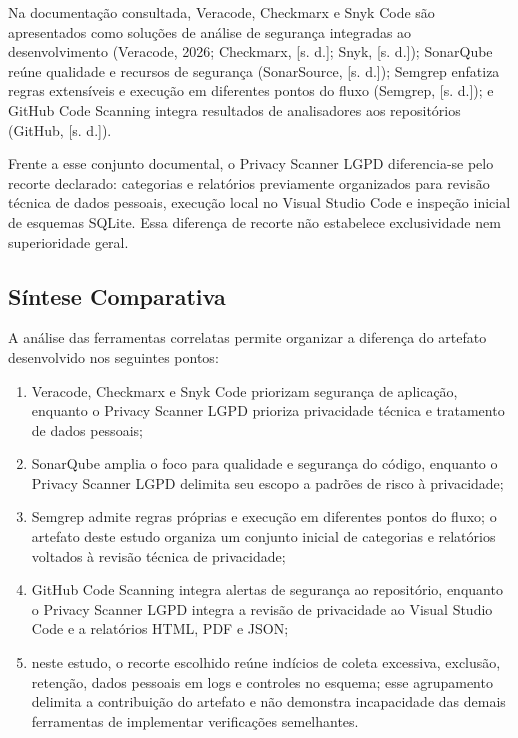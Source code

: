 \documentclass[12pt,a4paper,oneside]{report}
\begin{document}
Na documentação consultada, Veracode, Checkmarx e Snyk Code são apresentados como soluções de análise de segurança integradas ao desenvolvimento (Veracode, 2026; Checkmarx, [s. d.]; Snyk, [s. d.]); SonarQube reúne qualidade e recursos de segurança (SonarSource, [s. d.]); Semgrep enfatiza regras extensíveis e execução em diferentes pontos do fluxo (Semgrep, [s. d.]); e GitHub Code Scanning integra resultados de analisadores aos repositórios (GitHub, [s. d.]).

Frente a esse conjunto documental, o Privacy Scanner LGPD diferencia-se pelo recorte declarado: categorias e relatórios previamente organizados para revisão técnica de dados pessoais, execução local no Visual Studio Code e inspeção inicial de esquemas SQLite. Essa diferença de recorte não estabelece exclusividade nem superioridade geral.

\subsection{Síntese Comparativa}

A análise das ferramentas correlatas permite organizar a diferença do artefato desenvolvido nos seguintes pontos:

\begin{enumerate}
\item Veracode, Checkmarx e Snyk Code priorizam segurança de aplicação, enquanto o Privacy Scanner LGPD prioriza privacidade técnica e tratamento de dados pessoais;
\item SonarQube amplia o foco para qualidade e segurança do código, enquanto o Privacy Scanner LGPD delimita seu escopo a padrões de risco à privacidade;
\item Semgrep admite regras próprias e execução em diferentes pontos do fluxo; o artefato deste estudo organiza um conjunto inicial de categorias e relatórios voltados à revisão técnica de privacidade;
\item GitHub Code Scanning integra alertas de segurança ao repositório, enquanto o Privacy Scanner LGPD integra a revisão de privacidade ao Visual Studio Code e a relatórios HTML, PDF e JSON;
\item neste estudo, o recorte escolhido reúne indícios de coleta excessiva, exclusão, retenção, dados pessoais em logs e controles no esquema; esse agrupamento delimita a contribuição do artefato e não demonstra incapacidade das demais ferramentas de implementar verificações semelhantes.
\end{enumerate}
\end{document}
